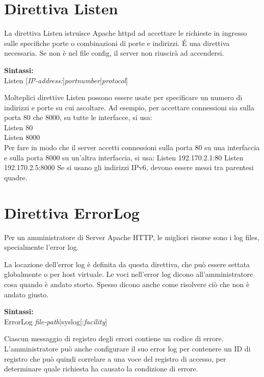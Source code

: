 \section{Direttiva Listen}
La direttiva Listen istruisce Apache httpd ad accettare le richieste in ingresso sulle specifiche porte o combinazioni di porte e indirizzi. \'E una direttiva necessaria. Se non è nel file config, il server non riuscirà ad accendersi.\\
\begin{center}
    \textbf{Sintassi:}\\
    Listen [\emph{IP-address:}]\emph{portnumber}[\emph{protocol}]\\
\end{center}
Molteplici direttive Listen possono essere usate per specificare un numero di indirizzi e porte su cui ascoltare. Ad esempio, per accettare connessioni sia sulla porta 80 che 8000, su tutte le interfacce, si usa:\\
Listen 80\\
Listen 8000\\
Per fare in modo che il server accetti connessioni sulla porta 80 su una interfaccia e sulla porta 8000 su un'altra interfaccia, si usa:
Listen 192.170.2.1:80
Listen 192.170.2.5:8000
Se si usano gli indirizzi IPv6, devono essere messi tra parentesi quadre.


\section{Direttiva ErrorLog}
Per un amministratore di Server Apache HTTP, le migliori risorse sono i log files, specialmente l'error log.

La locazione dell'error log è definita da questa direttiva, che può essere settata globalmente o per host virtuale. Le voci nell'error log dicono all'amministratore cosa quando è andato storto. Spesso dicono anche come risolvere ciò che non è andato giusto. \\
\begin{center}
    \textbf{Sintassi:}\\
    ErrorLog \emph{file-path}$|$syslog[:\emph{facility}]\\
\end{center}
Ciascun messaggio di registro degli errori contiene un codice di errore. L'amministratore può anche configurare il suo error
log per contenere un ID di registro che può quindi correlare a una voce del registro di accesso, per determinare
quale richiesta ha causato la condizione di errore.

